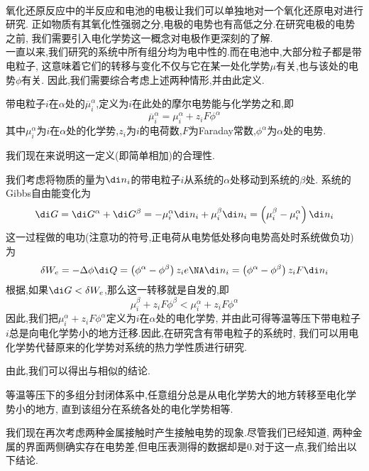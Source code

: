 \documentclass{ctexart}
\begin{document}
\pagestyle{plain}
\noindent{}\vspace{15pt}\\
\indent 氧化还原反应中的半反应和电池的电极让我们可以单独地对一个氧化还原电对进行研究.%
正如物质有其氧化性强弱之分,电极的电势也有高低之分.在研究电极的电势之前,%
我们需要引入电化学势这一概念对电极作更深刻的了解.\vspace{12pt}\\
\indent 一直以来,我们研究的系统中所有组分均为电中性的.而在电池中,大部分粒子都是带电粒子,%
这意味着它们的转移与变化不仅与它在某一处化学势$\mu$有关,也与该处的电势$\phi$有关.%
因此,我们需要综合考虑上述两种情形,并由此定义.
\begin{definition}[6C.1.1 电化学势]
    带电粒子$i$在$\alpha$处的$\overline{\mu}_i^\alpha$,定义为$i$在此处的摩尔电势能与化学势之和,即
    \[\overline{\mu}_i^\alpha=\mu_i^\alpha+z_iF\phi^\alpha\]
    其中$\mu_i^\alpha$为$i$在$\alpha$处的化学势,$z_i$为$i$的电荷数,$F$为Faraday常数,$\phi^\alpha$为$\alpha$处的电势.
\end{definition}
我们现在来说明这一定义(即简单相加)的合理性.
\begin{derivation}
    我们考虑将物质的量为$\di n_i$的带电粒子$i$从系统的$\alpha$处移动到系统的$\beta$处.%
    系统的Gibbs自由能变化为
    \[\di G=\di G^\alpha+\di G^\beta=-\mu_i^\alpha\di n_i+\mu_i^\beta\di n_i=\left(\mu_i^\beta-\mu_i^\alpha\right)\di n_i\]
    这一过程做的电功(注意功的符号,正电荷从电势低处移向电势高处时系统做负功)为
    \[\delta W_e=-\Delta\phi\di Q=\left(\phi^\alpha-\phi^\beta\right)z_ie\NA\di n_i=\left(\phi^\alpha-\phi^\beta\right)z_iF\di n_i\]
    根据,如果$\di G<\delta W_e$,那么这一转移就是自发的,即
    \[\mu_i^\beta+z_iF\phi^\beta<\mu_i^\alpha+z_iF\phi^\alpha\]
    因此,我们把$\mu_i^\alpha+z_iF\phi^\alpha$定义为$i$在$\alpha$处的电化学势,%
    并由此可得等温等压下带电粒子$i$总是向电化学势小的地方迁移.因此,在研究含有带电粒子的系统时,%
    我们可以用电化学势代替原来的化学势对系统的热力学性质进行研究.
\end{derivation}
由此,我们可以得出与相似的结论.
\begin{definition}[6C.1.2 含带电粒子的多组分体系自发变化的方向]
    等温等压下的多组分封闭体系中,任意组分总是从电化学势大的地方转移至电化学势小的地方,%
    直到该组分在系统各处的电化学势相等.
\end{definition}
我们现在再次考虑两种金属接触时产生接触电势的现象.尽管我们已经知道,%
两种金属的界面两侧确实存在电势差,但电压表测得的数据却是$0$.对于这一点,我们给出以下结论.
\end{document}
